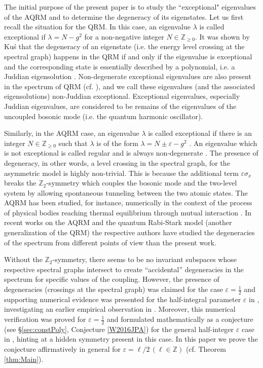 \documentclass[11pt]{article}
\numberwithin{equation}{section}
\newcommand{\Z}{\mathbb{Z}} %
\newcommand{\e}{\varepsilon}
\theoremstyle{plain}
\theoremstyle{definition}
\theoremstyle{remark}
\begin{document}
The initial purpose of the present paper is to study the ``exceptional" eigenvalues of the AQRM
and to determine the degeneracy of its eigenstates. Let us first recall the situation for the QRM. In this case, an eigenvalue \(\lambda\) is
called exceptional if \( \lambda = N - g^2\) for a non-negative integer \(N \in \Z_{\geq 0}\). It was shown by Ku\'s \cite{K1985JMP} that the
degeneracy of an eigenstate (i.e. the energy level crossing at the spectral graph) happens in the QRM if and only if the eigenvalue is exceptional
and the corresponding state is essentially described by a polynomial, i.e. a Juddian eigensolution \cite{J1079}. Non-degenerate
exceptional eigenvalues are also present in the spectrum of QRM (cf. \cite{MPS2013,B2013MfI}), and we call these eigenvalues (and the associated
eigensolutions) non-Juddian exceptional. Exceptional eigenvalues, especially Juddian eigenvalues, are considered to be remains
of the eigenvalues of the uncoupled bosonic mode (i.e. the quantum harmonic oscillator).

Similarly, in the AQRM case, an eigenvalue \(\lambda\) is called exceptional if there is an integer \(N \in \Z_{\geq 0}\) such that
\( \lambda\) is of the form  \( \lambda= N \pm \e - g^2\) \cite{LB2015JPA}. An eigenvalue which is not exceptional
is called regular and is always non-degenerate \cite{B2011PRL}. The presence of degeneracy, in other words, a level crossing in the spectral graph,
for the asymmetric model is highly non-trivial. This is because the additional term $\e \sigma_x$ breaks the $\Z_2$-symmetry
which couples the bosonic mode and the two-level system by allowing spontaneous tunneling between the two atomic states.
The AQRM has been studied, for instance, numerically in the context of the process of physical bodies reaching thermal
equilibrium through mutual interaction \cite{La2013}. In recent works \cite{EJ2017,SK2017} on the AQRM and the quantum
Rabi-Stark model (another generalization of the QRM) the respective authors have studied the degeneracies of the spectrum from different
points of view than the present work.

Without the $\Z_2$-symmetry, there seems to be no invariant subspaces whose respective spectral graphs intersect to create
``accidental'' degeneracies in the spectrum for specific values of the coupling. However, the presence of degeneracies (crossings
at the spectral graph) was claimed for the case $\e=\frac12$ and supporting numerical evidence was presented for the half-integral
parameter $\e$ in \cite{LB2015JPA}, investigating an earlier empirical observation in \cite{B2011PRL}.
Moreover, this numerical verification was proved for $\e=\frac12$ and formulated mathematically as a conjecture
(see \S \ref{sec:constPoly}, Conjecture \ref{W2016JPA}) for the general half-integer $\e$ case in \cite{W2016JPA},
hinting at a hidden symmetry present in this case. In this paper we prove the conjecture affirmatively in general for \(\e = \ell/2 \, (\ell \in \Z) \)
(cf. Theorem \ref{thm:Main}).
\end{document}
